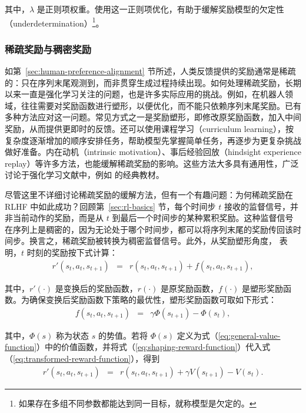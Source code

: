 \noindent 其中，$\lambda$ 是正则项权重。使用这一正则项优化，有助于缓解奖励模型的欠定性（underdetermination）\footnote{如果存在多组不同参数都能达到同一目标，就称模型是欠定的。}。

\subsubsection{稀疏奖励与稠密奖励}

\noindent 如第~\ref{sec:human-preference-alignment} 节所述，人类反馈提供的奖励通常是稀疏的：只在序列末尾观测到，而非贯穿生成过程持续出现。如何处理稀疏奖励，长期以来一直是强化学习关注的问题，也是许多实际应用的挑战。例如，在机器人领域，往往需要对奖励函数进行塑形，以便优化，而不能只依赖序列末尾奖励。已有多种方法应对这一问题。常见方式之一是奖励塑形，即修改原奖励函数，加入中间奖励，从而提供更即时的反馈。还可以使用课程学习（curriculum learning），按复杂度逐渐增加的顺序安排任务，帮助模型先掌握简单任务，再逐步为更复杂挑战做好准备。内在动机（intrinsic motivation）、事后经验回放（hindsight experience replay）等许多方法，也能缓解稀疏奖励的影响。这些方法大多具有通用性，广泛讨论于强化学习文献中，例如 \citet{Sutton-and-Barto:2018RL} 的经典教材。

尽管这里不详细讨论稀疏奖励的缓解方法，但有一个有趣问题：为何稀疏奖励在 RLHF 中如此成功？回顾第~\ref{sec:rl-basics} 节，每个时间步 $t$ 接收的监督信号，并非当前动作的奖励，而是从 $t$ 到最后一个时间步的某种累积奖励。这种监督信号在序列上是稠密的，因为无论处于哪个时间步，都可以将序列末尾的奖励传回该时间步。换言之，稀疏奖励被转换为稠密监督信号。此外，从奖励塑形角度，\citet{ng1999-etal:policy} 表明，$t$ 时刻的奖励按下式计算：
\begin{eqnarray}
r'(s_t,a_t,s_{t+1}) & = & r(s_t,a_t,s_{t+1}) + f(s_t,a_t,s_{t+1}), \label{eq:transformed-reward-function}
\end{eqnarray}

\noindent 其中，$r'(\cdot)$ 是变换后的奖励函数，$r(\cdot)$ 是原奖励函数，$f(\cdot)$ 是塑形奖励函数。为确保变换后奖励函数下策略的最优性，塑形奖励函数可取如下形式：
\begin{eqnarray}
f(s_t,a_t,s_{t+1}) & = & \gamma \Phi(s_{t+1}) - \Phi(s_t), \label{eq:shaping-reward-function}
\end{eqnarray}

\noindent 其中，$\Phi(s)$ 称为状态 $s$ 的势值。若将 $\Phi(s)$ 定义为式（\ref{eq:general-value-function}）中的价值函数，并将式（\ref{eq:shaping-reward-function}）代入式（\ref{eq:transformed-reward-function}），得到
\begin{eqnarray}
r'(s_t,a_t,s_{t+1}) & = & r(s_t,a_t,s_{t+1}) + \gamma V(s_{t+1}) - V(s_t).
\end{eqnarray}

